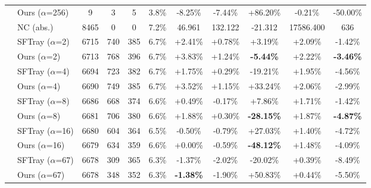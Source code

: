 \begin{table}[t]
{\begin{tabular}{ll|cccc|ccc|cc}
 & Ours ($\alpha$=256) & 9 & 3 & 5 & 3.8\% & -8.25\% & -7.44\% & +86.20\% & -0.21\% & -50.00\% \\

\addlinespace[0.3em]

\midrule

\multirow{17}{*}{cva6} & NC (abs.) & 8465 & 0 & 0 & 7.2\% & 46.961 & 132.122 & -21.312 & 17586.400 & 636 \\

\addlinespace[0.4em]

 & SFTray ($\alpha$=2) & 6715 & 740 & 385 & 6.7\% & +2.41\% & +0.78\% & +3.19\% & +2.09\% & -1.42\% \\

 & Ours ($\alpha$=2) & 6713 & 768 & 396 & 6.7\% & +3.83\% & +1.24\% & \textbf{-5.44\%} & +2.22\% & \textbf{-3.46\%} \\

\addlinespace[0.3em]

 & SFTray ($\alpha$=4) & 6694 & 723 & 382 & 6.7\% & +1.75\% & +0.29\% & -19.21\% & +1.95\% & -4.56\% \\

 & Ours ($\alpha$=4) & 6690 & 749 & 385 & 6.7\% & +3.52\% & +1.15\% & +33.24\% & +2.06\% & -2.99\% \\

\addlinespace[0.3em]

 & SFTray ($\alpha$=8) & 6686 & 668 & 374 & 6.6\% & +0.49\% & -0.17\% & +7.86\% & +1.71\% & -1.42\% \\

 & Ours ($\alpha$=8) & 6681 & 706 & 380 & 6.6\% & +1.88\% & +0.30\% & \textbf{-28.15\%} & +1.87\% & \textbf{-4.87\%} \\

\addlinespace[0.3em]

 & SFTray ($\alpha$=16) & 6680 & 604 & 364 & 6.5\% & -0.50\% & -0.79\% & +27.03\% & +1.40\% & -4.72\% \\

 & Ours ($\alpha$=16) & 6679 & 634 & 359 & 6.6\% & +0.00\% & -0.59\% & \textbf{-48.12\%} & +1.48\% & -4.09\% \\

\addlinespace[0.3em]

 & SFTray ($\alpha$=67) & 6678 & 309 & 365 & 6.3\% & -1.37\% & -2.02\% & -20.02\% & +0.39\% & -8.49\% \\

 & Ours ($\alpha$=67) & 6678 & 348 & 352 & 6.3\% & \textbf{-1.38\%} & -1.90\% & +50.83\% & +0.44\% & -5.50\% \\


\end{tabular}}
\end{table}
